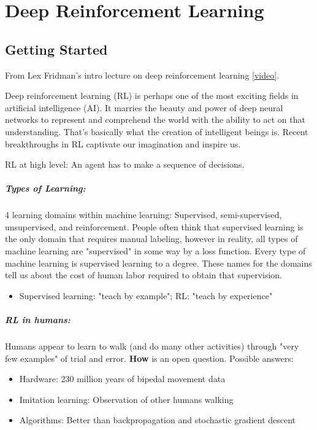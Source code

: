 \chapter{Deep Reinforcement Learning}

\section{Getting Started}

From Lex Fridman's intro lecture on deep reinforcement learning \href{https://youtu.be/zR11FLZ-O9M?t=0}{[video]}.

Deep reinforcement learning (RL) is perhaps one of the most exciting fields in artificial intelligence (AI). It marries the beauty and power of deep neural networks to represent and comprehend the world with the ability to act on that understanding. That's basically what the creation of intelligent beings is. Recent breakthroughs in RL captivate our imagination and inspire us.  

RL at high level: An agent has to make a sequence of decisions. 

\paragraph*{Types of Learning:}
4 learning domains within machine learning: Supervised, semi-supervised, unsupervised, and reinforcement. People often think that supervised learning is the only domain that requires manual labeling, however in reality, all types of machine learning are "supervised" in some way by a loss function. Every type of machine learning is supervised learning to a degree. These names for the domains tell us about the cost of human labor required to obtain that supervision.
\begin{itemize}
	\item Supervised learning: "teach by example"; RL: "teach by experience"
\end{itemize}

\paragraph*{RL in humans: }
Humans appear to learn to walk (and do many other activities) through "very few examples" of trial and error. \textbf{How} is an open question. Possible answers: 
\begin{itemize}
	\item Hardware: 230 million years of bipedal movement data
	\item Imitation learning: Observation of other humans walking
	\item Algorithms: Better than backpropagation and stochastic gradient descent
\end{itemize}

